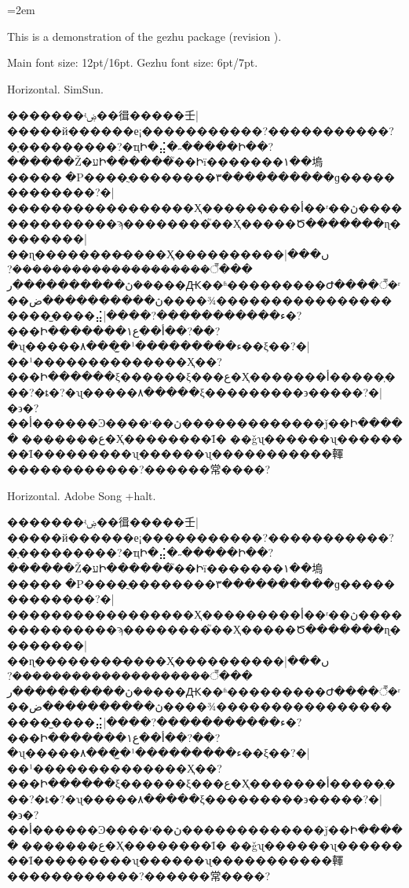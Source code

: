 \documentclass[12pt]{article}
\newenvironment{showcase}[1]{%
  \begin{minipage}{0.4\textwidth}
  #1\par
  \begin{withgezhu}
}{%
  \end{withgezhu}
  \bigskip
  \end{minipage}
}
\begin{document}
\parindent=2em

This is a demonstration of the gezhu package (revision \gezhurevision).

Main font size: 12pt/16pt. Gezhu font size: 6pt/7pt.
\bigskip

\begin{showcase}{Horizontal. SimSun.}
\setgezhuraise{-1pt}
�������ʵۻ��㣬�����壬|{�����й������е¡�����������?�����������?�ַ���������?�ҵԻ�⣬�˶�����Ի��?������Ž�עԻ������֮��Իï�������١��塢�����ֵ�֮�Ρ����ֲ��������٣����������ɡ���}����������?�|{�����������������Ҳ���������أ��ʳ��ڽ��������������ϡ�}�������֮��Ҳ�����Ծ�������ɳ��������|{��ɳ��������̶����Ҳ��}��������ں���|{���꣬��������������������?��ڽ����������ر���Ԫ��ʱ���������Ժ����꣬�ʳ��ڽ����������ض����¾�������������}��������̫���⣬|{����?�����������ء�?���Ի�������أ��ع١��?��?�ʯ�����۸���̫�ء���}������¹��ξ��?�|{��¹��������������Ҳ��?���Ի������ξ������ξ���ع�Ҳ�������أ�����ְ���?�ȶ�?�ʯ�����۸�����ξ����}�����϶�����?�|{�϶�?��أ������Ͽ����ʳ��ڽ�������������ǰ��Ի������������ع�Ҳ��������Ϊ���ǧʯ������ʯ��������Ϊ���������ʯ������ʯ����}�������䡣������������?������常����?
\end{showcase}
\hfil
\begin{showcase}{Horizontal. Adobe Song +halt.\par
\setgezhuraise{-1pt}
\haltskipscheme}
�������ʵۻ��㣬�����壬|{�����й������е¡�����������?�����������?�ַ���������?�ҵԻ�⣬�˶�����Ի��?������Ž�עԻ������֮��Իï�������١��塢�����ֵ�֮�Ρ����ֲ��������٣����������ɡ���}����������?�|{�����������������Ҳ���������أ��ʳ��ڽ��������������ϡ�}�������֮��Ҳ�����Ծ�������ɳ��������|{��ɳ��������̶����Ҳ��}��������ں���|{���꣬��������������������?��ڽ����������ر���Ԫ��ʱ���������Ժ����꣬�ʳ��ڽ����������ض����¾�������������}��������̫���⣬|{����?�����������ء�?���Ի�������أ��ع١��?��?�ʯ�����۸���̫�ء���}������¹��ξ��?�|{��¹��������������Ҳ��?���Ի������ξ������ξ���ع�Ҳ�������أ�����ְ���?�ȶ�?�ʯ�����۸�����ξ����}�����϶�����?�|{�϶�?��أ������Ͽ����ʳ��ڽ�������������ǰ��Ի������������ع�Ҳ��������Ϊ���ǧʯ������ʯ��������Ϊ���������ʯ������ʯ����}�������䡣������������?������常����?
\end{showcase}
\end{document}
